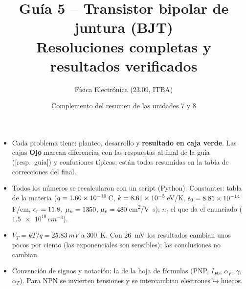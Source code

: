 \documentclass[11pt,a4paper]{article}
\title{\color{azul}\textbf{Guía 5 -- Transistor bipolar de juntura (BJT)}\\[0.3em]
  \large Resoluciones completas y resultados verificados}
\author{Física Electrónica (23.09, ITBA)}
\date{Complemento del resumen de las unidades 7 y 8}
\newcommand{\aF}{\alpha_F}
\newcommand{\aT}{\alpha_T}
\newcommand{\guia}{\textsf{[resp.\ guía]}}
\begin{document}
\maketitle
\thispagestyle{empty}

\begin{tcolorbox}[base,colback=white,colframe=gris,title={Cómo usar este solucionario}]
\small
\begin{itemize}
  \item Cada problema tiene: planteo, desarrollo y \textbf{resultado en caja verde}. Las cajas
  \textcolor{rojo}{\textbf{Ojo}} marcan diferencias con las respuestas al final de la guía
  (\guia) y confusiones típicas; están todas resumidas en la tabla de correcciones del final.
  \item Todos los números se recalcularon con un script (Python). Constantes: tabla de la
  materia ($q=\num{1.60e-19}$\,C, $k=\num{8.61e-5}$\,eV/K, $\epsilon_0=\num{8.85e-14}$\,F/cm, $\epsilon_r=11.8$,
  $\mu_n=1350$, $\mu_p=480$\,\si{cm^2/V.s}); $n_i$ el que da el enunciado
  ($\num{1.5e10}\,\si{cm^{-3}}$).
  \item $V_T=kT/q=\SI{25.83}{mV}$ a \SI{300}{K}. Con \SI{26}{mV} los resultados cambian unos pocos
  por ciento (las exponenciales son sensibles); las conclusiones no cambian.
  \item Convención de signos y notación: la de la hoja de fórmulas (PNP, $I_{F0}$, $\aF$, $\gamma$,
  $\aT$). Para NPN se invierten tensiones y se intercambian electrones$\leftrightarrow$huecos.
\end{itemize}
\end{tcolorbox}
\end{document}
